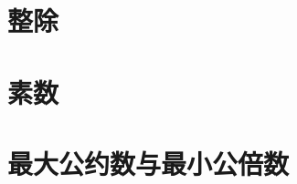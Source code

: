\section{整除}
\label{prime:sec:div}

\questions

\section{素数}
\label{prime:sec:prime}

\questions

\section{最大公约数与最小公倍数}
\label{prime:sec:gcdlcm}

\questions
